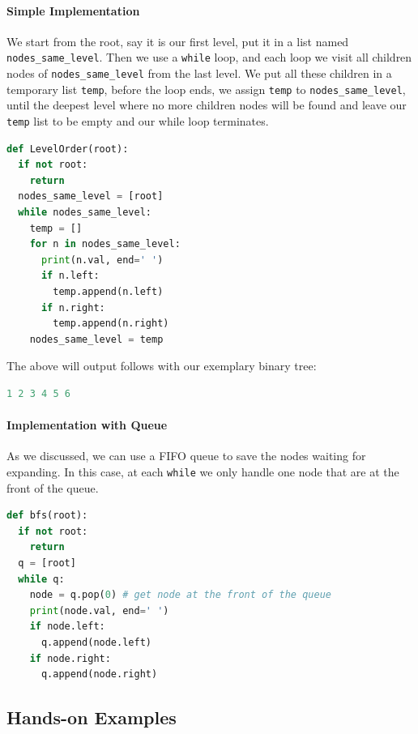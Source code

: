 \documentclass[main.tex]{subfiles}
\begin{document}
\paragraph{Simple Implementation} We start from the root, say it is our first level, put it in a list named \texttt{nodes\_same\_level}. Then we use a \texttt{while} loop, and each loop we visit all children nodes of \texttt{nodes\_same\_level} from the last level. We put all these children in a temporary list \texttt{temp}, before the loop ends, we assign \texttt{temp} to \texttt{nodes\_same\_level}, until the deepest level where no more children nodes will be found and leave our \texttt{temp} list to be empty and our while loop terminates. 
\begin{lstlisting}[language = Python]
def LevelOrder(root):
  if not root:
    return
  nodes_same_level = [root]
  while nodes_same_level:
    temp = []
    for n in nodes_same_level:
      print(n.val, end=' ')
      if n.left:
        temp.append(n.left)
      if n.right:
        temp.append(n.right)
    nodes_same_level = temp
\end{lstlisting}
The above will output  follows with our exemplary binary tree:
\begin{lstlisting}[language=Python]
1 2 3 4 5 6 
\end{lstlisting}

\paragraph{Implementation with Queue} As we discussed, we can use a FIFO queue to save the nodes waiting for expanding. In this case, at each \texttt{while} we only handle one node that are at the front of the queue. 
\begin{lstlisting}[language=Python]
def bfs(root):
  if not root:
    return
  q = [root]
  while q:
    node = q.pop(0) # get node at the front of the queue
    print(node.val, end=' ')
    if node.left:
      q.append(node.left)
    if node.right:
      q.append(node.right)
\end{lstlisting}






 
 
 \subsection{Hands-on Examples}
 
\end{document}
